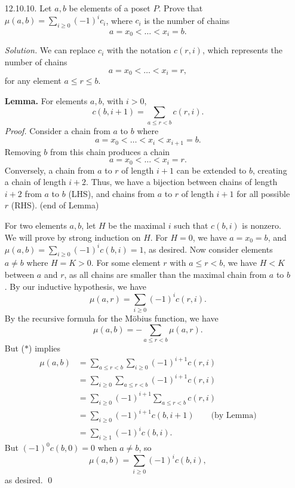 \documentclass[11pt,letterpaper]{article}
\newenvironment{solution}{\color{Violet}\textit{Solution.}}{\color{black}}
\begin{document}
\begin{enumerate}
    \item[12.10.10.] Let $a,b$ be elements of a poset $P$. Prove that $\mu(a,b)=\sum_{i\geq 0}(-1)^ic_i$, where $c_i$ is the number of chains
    \[  a = x_0 < \dots < x_i = b.  \]

    \begin{solution}
        We can replace $c_i$ with the notation $c(r,i)$, which represents the number of chains
        \[  a = x_0 < \dots < x_i = r,  \]
        for any element $a \leq r \leq b$.

        \textbf{Lemma.} For elements $a,b$, with $i>0$,
        \[
            c(b,i+1) = \sum_{a \leq r < b} c(r,i).
        \]
        \textit{Proof.} Consider a chain from $a$ to $b$ where
        \[ a = x_0 < \dots < x_i < x_{i+1} = b. \]
        Removing $b$ from this chain produces a chain
        \[ a = x_0 < \dots < x_i = r.\]
        Conversely, a chain from $a$ to $r$ of length $i+1$ can be extended to $b$, creating a chain of length $i+2$. Thus, we have a bijection between chains of length $i+2$ from $a$ to $b$ (LHS), and chains from $a$ to $r$ of length $i+1$ for all possible $r$ (RHS). (end of Lemma)

        For two elements $a,b$, let $H$ be the maximal $i$ such that $c(b,i)$ is nonzero. We will prove by strong induction on $H$. For $H=0$, we have $a=x_0=b$, and $\mu(a,b) = \sum_{i\geq 0}(-1)^ic(b,i) = 1$, as desired. Now consider elements $a\neq b$ where $H=K>0$. For some element $r$ with $a \leq r < b$, we have $H < K$ between $a$ and $r$, as all chains are smaller than the maximal chain from $a$ to $b$. By our inductive hypothesis, we have
        \[  \mu(a,r)=\sum_{i\geq 0}(-1)^ic(r,i). \tag{$\ast$}   \] 
        By the recursive formula for the Möbius function, we have
        \[    \mu(a,b) = -\sum_{a \leq r < b} \mu(a,r). \]
        But ($\ast$) implies
        \begin{align*}
            \mu(a,b) &= \sum_{a \leq r < b} \sum_{i \geq 0} (-1)^{i+1}c(r,i) \\
            &= \sum_{i \geq 0} \sum_{a \leq r < b} (-1)^{i+1}c(r,i) \\
            &= \sum_{i \geq 0} (-1)^{i+1} \sum_{a \leq r < b}c(r,i) \\
            &= \sum_{i \geq 0} (-1)^{i+1} c(b, i+1) \qquad\text{(by Lemma)}\\
            &= \sum_{i \geq 1} (-1)^{i} c(b, i).
        \end{align*}
        But $(-1)^0c(b,0)=0$ when $a\neq b$, so
        \[
            \mu(a,b) = \sum_{i \geq 0} (-1)^{i} c(b, i),
        \]
        as desired. \qed



\end{solution}
\end{enumerate}
\end{document}
